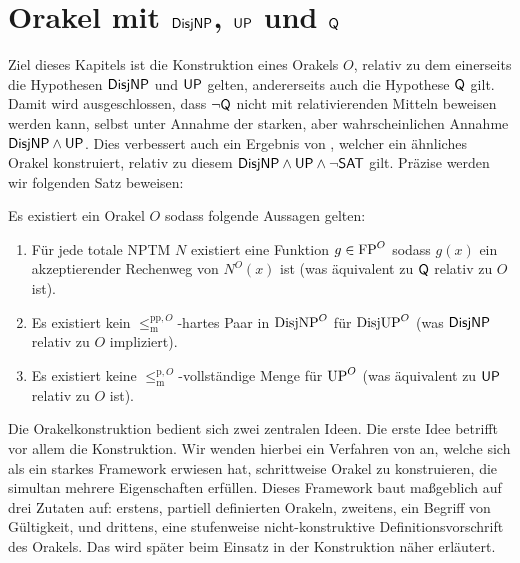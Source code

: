 \chapter{Orakel mit $\mathsf{DisjNP}$, $\mathsf{UP}$ und $\mathsf{Q}$}\label{chap:orakel}

Ziel dieses Kapitels ist die Konstruktion eines Orakels $O$, relativ zu dem einerseits die Hypothesen $\mathsf{DisjNP}$ und $\mathsf{UP}$ gelten, andererseits auch die Hypothese $\mathsf{Q}$ gilt.
Damit wird ausgeschlossen, dass $\neg\mathsf{Q}$ nicht mit relativierenden Mitteln beweisen werden kann, selbst unter Annahme der starken, aber wahrscheinlichen Annahme $\mathsf{DisjNP}\land\mathsf{UP}$.
Dies verbessert auch ein Ergebnis von \textcite[Cor.~3.3]{dose_oracle_2020}, welcher ein ähnliches Orakel konstruiert, relativ zu diesem $\mathsf{DisjNP}\land\mathsf{UP}\land\neg\mathsf{SAT}$ gilt.
Präzise werden wir folgenden Satz beweisen:

\begin{theorem}\label{thm:myoracle}
    Es existiert ein Orakel $O$ sodass folgende Aussagen gelten:
    \begin{enumerate}
        \item Für jede totale NPTM $N$ existiert eine Funktion $g\in\mathrm{FP}^O$ sodass $g(x)$ ein akzeptierender Rechenweg von $N^O(x)$ ist (was äquivalent zu $\mathsf{Q}$ relativ zu $O$ ist).
        \item Es existiert kein $\leq_\mathrm{m}^{\mathrm{pp},O}$-hartes Paar in $\mathrm{DisjNP}^O$ für $\mathrm{DisjUP}^O$ (was $\mathsf{DisjNP}$ relativ zu $O$ impliziert).
        \item Es existiert keine $\leq_\mathrm{m}^{\mathrm{p},O}$-vollständige Menge für $\mathrm{UP}^O$ (was äquivalent zu $\mathsf{UP}$ relativ zu $O$ ist).
    \end{enumerate}
\end{theorem}

Die Orakelkonstruktion bedient sich zwei zentralen Ideen. 
Die erste Idee betrifft vor allem die Konstruktion. 
Wir wenden hierbei ein Verfahren von \textcite{dose_np-completeness_2019} an, welche sich als ein starkes Framework erwiesen hat, schrittweise Orakel zu konstruieren, die simultan mehrere Eigenschaften erfüllen. Dieses Framework baut maßgeblich auf drei Zutaten auf: erstens, partiell definierten Orakeln, zweitens, ein Begriff von Gültigkeit, und drittens, eine stufenweise nicht-konstruktive Definitionsvorschrift des Orakels.
Das wird später beim Einsatz in der Konstruktion näher erläutert.

